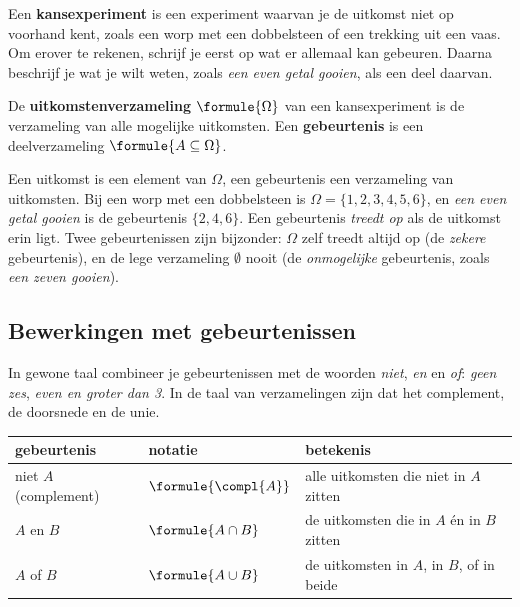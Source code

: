 Een \textbf{kansexperiment} is een experiment waarvan je de uitkomst niet op voorhand kent, zoals een worp met een dobbelsteen of een trekking uit een vaas. Om erover te rekenen, schrijf je eerst op wat er allemaal kan gebeuren. Daarna beschrijf je wat je wilt weten, zoals \textit{een even getal gooien}, als een deel daarvan.

\begin{theorie}
De \textbf{\textcolor{accent}{uitkomstenverzameling}} $\formule{\Omega}$ van een kansexperiment is de verzameling van alle mogelijke uitkomsten. Een \textbf{\textcolor{accent}{gebeurtenis}} is een deelverzameling $\formule{A \subseteq \Omega}$.
\end{theorie}

Een uitkomst is een element van $\Omega$, een gebeurtenis een verzameling van uitkomsten. Bij een worp met een dobbelsteen is $\Omega = \{1, 2, 3, 4, 5, 6\}$, en \textit{een even getal gooien} is de gebeurtenis $\{2, 4, 6\}$. Een gebeurtenis \textit{treedt op} als de uitkomst erin ligt. Twee gebeurtenissen zijn bijzonder: $\Omega$ zelf treedt altijd op (de \textit{zekere} gebeurtenis), en de lege verzameling $\emptyset$ nooit (de \textit{onmogelijke} gebeurtenis, zoals \textit{een zeven gooien}).

\subsection{Bewerkingen met gebeurtenissen}

In gewone taal combineer je gebeurtenissen met de woorden \textit{niet}, \textit{en} en \textit{of}: \textit{geen zes}, \textit{even en groter dan 3}. In de taal van verzamelingen zijn dat het complement, de doorsnede en de unie.

\begin{theorie}
{\centering{}\renewcommand{\arraystretch}{1.45}%
\begin{tabular}{|>{\centering\arraybackslash}m{3.6cm}|>{\centering\arraybackslash}m{2.6cm}|>{\centering\arraybackslash}m{6.4cm}|}
\hline
\textbf{gebeurtenis} & \textbf{notatie} & \textbf{betekenis} \\ \hline
niet $A$ (complement) & $\formule{\compl{A}}$ & alle uitkomsten die niet in $A$ zitten \\ \hline
$A$ en $B$ & $\formule{A \cap B}$ & de uitkomsten die in $A$ én in $B$ zitten \\ \hline
$A$ of $B$ & $\formule{A \cup B}$ & de uitkomsten in $A$, in $B$, of in beide \\ \hline
\end{tabular}\par}
\end{theorie}


